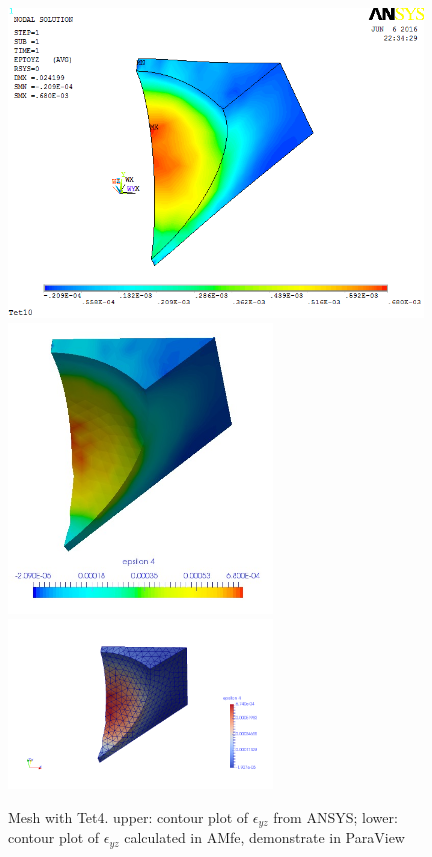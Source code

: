 \begin{figure}[htbp]
	\begin{center}
		\includegraphics[width=11cm,clip]{Tet4Eyz.png} 	
		\includegraphics[width=7cm,clip]{Tet4EyzPD.png} 			
		\includegraphics[width=7cm,clip]{Tet4EyzP.png} 		
		\caption{Mesh with Tet4. upper: contour plot of $\epsilon_{yz}$ from ANSYS; lower: contour plot of $\epsilon_{yz}$ calculated in AMfe, demonstrate in ParaView} \label{fig: Tet4Eyz}
	\end{center}
\end{figure}
\clearpage 

